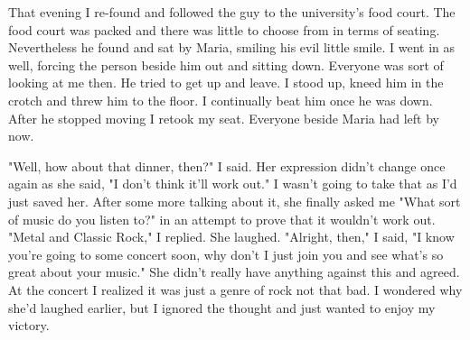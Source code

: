 That evening I re-found and followed the guy to the university's food court.  The food court was packed and there was little to choose from in terms of seating.  Nevertheless he found and sat by Maria, smiling his evil little smile.  I went in as well, forcing the person beside him out and sitting down.  Everyone was sort of looking at me then.  He tried to get up and leave.  I stood up, kneed him in the crotch and threw him to the floor.  I continually beat him once he was down.  After he stopped moving I retook my seat.  Everyone beside Maria had left by now.

  "Well, how about that dinner, then?" I said.
Her expression didn't change once again as she said, "I don't think it'll work out."  I wasn't going to take that as I'd just saved her.  After some more talking about it, she finally asked me "What sort of music do you listen to?" in an attempt to prove that it wouldn't work out.
  "Metal and Classic Rock," I replied.
She laughed.
  "Alright, then," I said, "I know you're going to some concert soon, why don't I just join you and see what's so great about your music."
She didn't really have anything against this and agreed.  At the concert I realized it was just a genre of rock not that bad.  I wondered why she'd laughed earlier, but I ignored the thought and just wanted to enjoy my victory.

